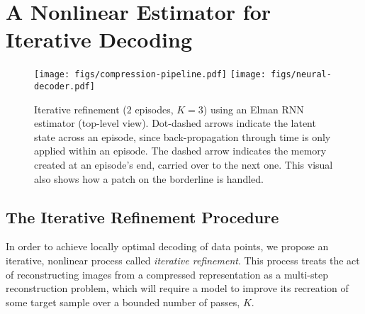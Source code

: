 \documentclass[smallabstract,smallcaptions]{dccpaper}
\begin{document}
\section{A Nonlinear Estimator for Iterative Decoding}
\label{iterative_refinement}

\begin{figure}[t]
\centering
\texttt{[image: figs/compression-pipeline.pdf]}
\texttt{[image: figs/neural-decoder.pdf]}
\caption{Iterative refinement ($2$ episodes, $K=3$) using an Elman RNN estimator (top-level view).
Dot-dashed arrows indicate the latent state across an episode, since back-propagation through time is only applied within an episode. The dashed arrow indicates the memory created at an episode's end, carried over to the next one. This visual also shows how a patch on the borderline is handled.}
\label{fig:sysarch}
\end{figure}

\subsection{The Iterative Refinement Procedure}
\label{refinement}
In order to achieve locally optimal decoding of data points, we propose an iterative, nonlinear process called \emph{iterative refinement}. This process treats the act of reconstructing images from a compressed representation as a multi-step reconstruction problem, which will require a model to improve its recreation of some target sample over a bounded number of passes, $K$.
\end{document}
